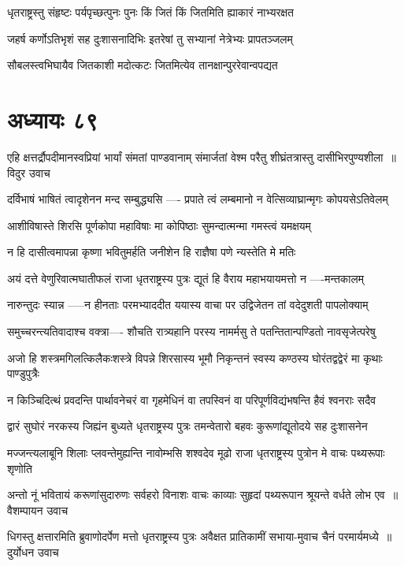 \twolineshloka
{धृतराष्ट्रस्तु संहृष्टः पर्यपृच्छत्पुनः पुनः}
{किं जितं किं जितमिति ह्याकारं नाभ्यरक्षत}


\twolineshloka
{जहर्ष कर्णोऽतिभृशं सह दुःशासनादिभिः}
{इतरेषां तु सभ्यानां नेत्रेभ्यः प्रापतञ्जलम्}


\twolineshloka
{सौबलस्त्वभिघायैव जितकाशी मदोत्कटः}
{जितमित्येव तानक्षान्पुररेवान्वपद्यत}


\chapter{अध्यायः ८९}
\twolineshloka
{एहि क्षत्तर्द्रौपदीमानस्वप्रियां भार्यां संमतां पाण्डवानाम्}
{संमार्जतां वेश्म परैतु शीघ्रंतत्रास्तु दासीभिरपुण्यशीला ॥विदुर उवाच}


\twolineshloka
{दर्विभाषं भाषितं त्वादृशेनन मन्द सम्बुद्ध्यसि ----}
{प्रपाते त्वं लम्बमानो न वेत्सिव्याघ्रान्मृगः कोपयसेऽतिवेलम्}


\twolineshloka
{आशीविषास्ते शिरसि पूर्णकोपा महाविषाः}
{मा कोपिष्ठाः सुमन्दात्मन्मा गमस्त्वं यमक्षयम्}


\twolineshloka
{न हि दासीत्वमापन्ना कृष्णा भवितुमर्हति}
{जनीशेन हि राज्ञैषा पणे न्यस्तेति मे मतिः}


\twolineshloka
{अयं दत्ते वेणुरिवात्मघातीफलं राजा धृतराष्ट्रस्य पुत्रः}
{द्यूतं हि वैराय महाभयायमत्तो न ----मन्तकालम्}


\twolineshloka
{नारुन्तुदः स्यान्न -----न हीनताः परमभ्याददीत}
{ययास्य वाचा पर उद्विजेतन तां वदेदुशती पापलोक्याम्}


\twolineshloka
{समुच्चरन्त्यतिवादाश्च वक्त्रा---- शौचति रात्र्यहानि}
{परस्य नामर्मसु ते पतन्तितान्पण्डितो नावसृजेत्परेषु}


\twolineshloka
{अजो हि शस्त्रमगिलत्किलैकःशस्त्रे विपन्ने शिरसास्य भूमौ}
{निकृन्तनं स्वस्य कण्ठस्य घोरंतद्वद्वेरं मा कृथाः पाण्डुपुत्रैः}


\twolineshloka
{न किञ्चिदित्थं प्रवदन्ति पार्थावनेचरं वा गृहमेधिनं वा}
{तपस्विनं वा परिपूर्णविद्यंभषन्ति हैवं श्वनराः सदैव}


\twolineshloka
{द्वारं सुघोरं नरकस्य जिह्यंन बुध्यते धृतराष्ट्रस्य पुत्रः}
{तमन्वेतारो बहवः कुरूणांद्यूतोदये सह दुःशासनेन}


\twolineshloka
{मज्जन्त्यलाबूनि शिलाः प्लवन्तेमुह्यन्ति नावोम्भसि शश्वदेव}
{मूढो राजा धृतराष्ट्रस्य पुत्रोन मे वाचः पथ्यरूपाः शृणोति}


\twolineshloka
{अन्तो नूं भवितायं करूणांसुदारुणः सर्वहरो विनाशः}
{वाचः काव्याः सुहृदां पथ्यरूपान श्रूयन्ते वर्धते लोभ एव ॥वैशम्पायन उवाच}


\twolineshloka
{धिगस्तु क्षत्तारमिति ब्रुवाणोदर्पेण मत्तो धृतराष्ट्रस्य पुत्रः}
{अवैक्षत प्रातिकामीं सभाया-मुवाच चैनं परमार्यमध्ये ॥दुर्योधन उवाच}


